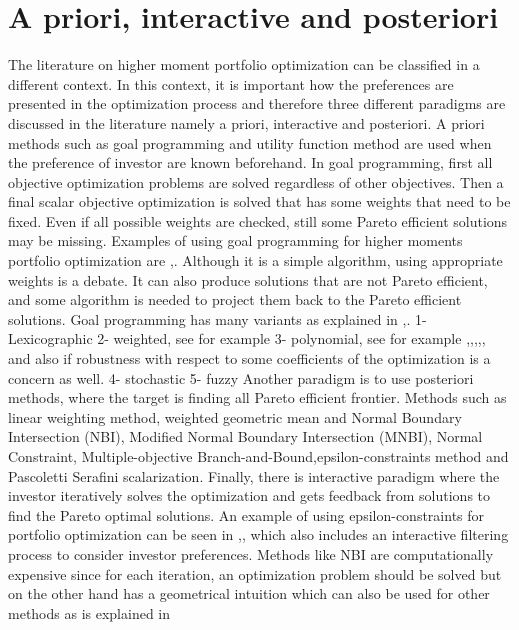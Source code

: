 \documentclass[12pt,a4paper]{article}
\numberwithin{equation}{section}
\begin{document}
\section{A priori, interactive and posteriori}
The literature on higher moment portfolio optimization can be classified in a different context. In this context, it is important how the preferences are presented in the optimization process and therefore three different paradigms are discussed in the literature namely a priori, interactive and posteriori. A priori methods such as goal programming and utility function method are used when the preference of investor are known beforehand. In goal programming, first all objective optimization problems are solved regardless of other objectives. Then a final scalar objective optimization is solved that has some weights that need to be fixed. Even if all possible weights are checked, still some Pareto efficient solutions may be missing. Examples of using goal programming for higher moments portfolio optimization are \citep{Aksarayli2018},\citep{Bergh2008}. Although it is a simple algorithm, using appropriate weights is a debate. It can also produce solutions that are not Pareto efficient, and some algorithm is needed to project them back to the Pareto efficient solutions. Goal programming has many variants as explained in \citep{Aouni2014},\citep{Tamiz2013}.
1- Lexicographic
2- weighted, see for example \citep{Chang2011}
3- polynomial, see for example \citep{Chang2008},\citep{Chunhachinda1997},\citep{Davies2009},\citep{Lai1991},\citep{Mhiri2010},\citep{Proelss2014} and also \citep{Ghahtarani2013} if robustness with respect to some coefficients of the optimization is a concern as well.
4- stochastic 
5- fuzzy
Another paradigm is to use posteriori methods, where the target is finding all Pareto efficient frontier. Methods such as linear weighting method, weighted geometric mean and Normal Boundary Intersection (NBI)\citep{Audet2008}, Modified Normal Boundary Intersection (MNBI), Normal Constraint, Multiple-objective Branch-and-Bound,epsilon-constraints method and Pascoletti Serafini scalarization. Finally, there is interactive paradigm where the investor iteratively solves the optimization and gets feedback from solutions to find the Pareto optimal solutions. An example of using epsilon-constraints for portfolio optimization can be seen in \citep{Xidonas2010},\citep{Xidonasetal2010},\citep{Xidonas2011} which also includes an interactive filtering process to consider investor preferences. Methods like NBI are computationally expensive since for each iteration, an optimization problem should be solved but on the other hand has a geometrical intuition which can also be used for other methods as is explained in \citep{Kanafi2015}
\end{document}
